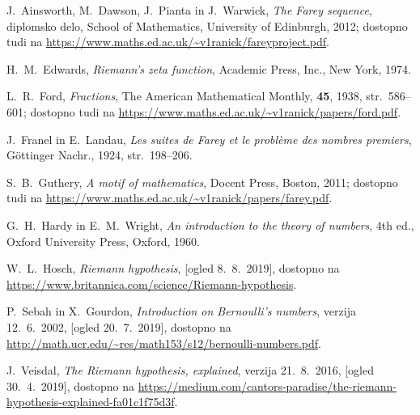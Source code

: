 \documentclass[mat1]{fmfdelo}
\begin{document}
\begin{thebibliography}{99}

 J.~Ainsworth, M.~Dawson, J.~Pianta in J.~Warwick, \emph{The Farey sequence}, diplomsko delo, School of Mathematics, University of Edinburgh, 2012; dostopno tudi na \url{https://www.maths.ed.ac.uk/~v1ranick/fareyproject.pdf}.

 H.~M.~Edwards, \emph{Riemann's zeta function}, Academic Press, Inc., New York, 1974.

 L.~R.~Ford, \emph{Fractions}, The American Mathematical Monthly, \textbf{45}, 1938, str.\ 586--601; dostopno tudi na \url{https://www.maths.ed.ac.uk/~v1ranick/papers/ford.pdf}.

 J.~Franel in E.~Landau, \emph{Les suites de Farey et le probl\`eme des nombres premiers}, G\"ottinger Nachr., 1924, str.\ 198--206.

 S.~B.~Guthery, \emph{A motif of mathematics}, Docent Press, Boston, 2011; dostopno tudi na \url{https://www.maths.ed.ac.uk/~v1ranick/papers/farey.pdf}.

 G.~H.~Hardy in E.~M.~Wright, \emph{An introduction to the theory of numbers}, 4th ed., Oxford University Press, Oxford, 1960.

 W.~L.~Hosch, \emph{Riemann hypothesis}, [ogled 8.~8.~2019], dostopno na \url{https://www.britannica.com/science/Riemann-hypothesis}.

 P.~Sebah in X.~Gourdon, \emph{Introduction on Bernoulli's numbers}, verzija 12.~6.~2002, [ogled 20.~7.~2019], dostopno na \url{http://math.ucr.edu/~res/math153/s12/bernoulli-numbers.pdf}.

 J.~Veisdal, \emph{The Riemann hypothesis, explained}, verzija 21.~8.~2016, [ogled 30.~4.~2019], dostopno na \url{https://medium.com/cantors-paradise/the-riemann-hypothesis-explained-fa01c1f75d3f}.

\end{thebibliography}
\end{document}
